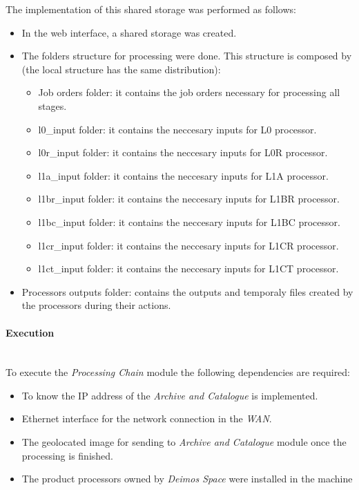 The implementation of this shared storage was performed as follows:
\begin{itemize}
\item In the \bonfire web interface, a shared storage was created. 
\item The folders structure for processing were done. This structure is composed
  by (the local structure has the same distribution): 
\begin{itemize}
\item Job orders folder: it contains the job orders necessary for processing all
  stages.
\item l0\_input folder: it contains the neccesary inputs for L0 processor. 
\item l0r\_input folder: it contains the neccesary inputs for L0R processor. 
\item l1a\_input folder: it contains the neccesary inputs for L1A processor. 
\item l1br\_input folder: it contains the neccesary inputs for L1BR processor. 
\item l1bc\_input folder: it contains the neccesary inputs for L1BC processor. 
\item l1cr\_input folder: it contains the neccesary inputs for L1CR processor. 
\item l1ct\_input folder: it contains the neccesary inputs for L1CT processor. 
\end{itemize}
\item Processors outputs folder: contains the outputs and temporaly files
  created by the processors during their actions.
\end{itemize}

\paragraph{Execution}~\\

To execute the \emph{Processing Chain} module the following dependencies are
required:
\begin{itemize}
\item To know the \ac{IP} address of the \emph{Archive and Catalogue} is
  implemented.
\item Ethernet interface for the network connection in the \bonfire \emph{WAN}.
\item The geolocated image for sending to \emph{Archive and Catalogue} module
  once the processing is finished. 
\item The product processors owned by \emph{Deimos Space} were installed in the
  machine
\end{itemize}


